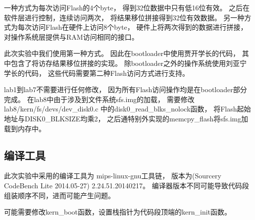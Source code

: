             一种方式为每次访问Flash的4个byte，%
            得到32位数据中只有低16位有效。%
            之后在软件层进行控制，连续访问两次，%
            将结果移位拼接得到32位有效数据。%
            另一种方式为每次访问Flash在硬件上访问8个byte，%
            硬件上将两次得到的数据进行拼接，%
            对操作系统层提供与RAM访问相同的接口。

            此次实验中我们使用第一种方式。%
            因此在bootloader中使用贾开学长的代码，%
            其中包含了将访存结果移位拼接的实现。%
            除bootloader之外的操作系统使用刘亚宁学长的代码，%
            这些代码需要第二种Flash访问方式进行支持。

            lab1到lab7不需要进行任何修改，%
            因为所有Flash访问操作均是在bootloader部分完成。%
            在lab8中由于涉及到文件系统sfs.img的加载，%
            需要修改lab8/kern/fs/devs/dev\_disk0.c%
            中的disk0\_read\_blks\_nolock函数，%
            将Flash起始地址与DISK0\_BLKSIZE均乘2，%
            之后通特别外实现的memcpy\_flash将sfs.img加载到内存中。

        \subsection{编译工具}
            此次实验中采用的编译工具为%
            mips-linux-gnu工具链，%
            版本为(Sourcery CodeBench Lite 2014.05-27)%
            2.24.51.20140217。%
            编译器版本不同可能导致代码段组装顺序不同，进而可能产生问题。%
    
            可能需要修改kern\_boot函数，设置栈指针为代码段顶端的kern\_init函数。

